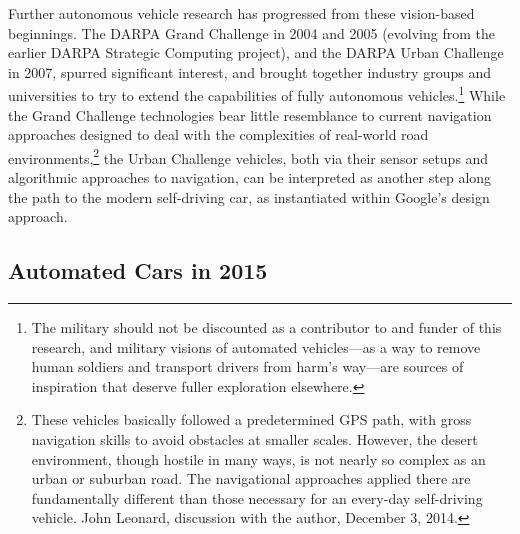 

Further autonomous vehicle research has progressed from
these vision-based beginnings. The
DARPA Grand Challenge in 2004 and 2005 (evolving from the earlier
  DARPA Strategic Computing project), and the DARPA Urban Challenge 
in 2007, spurred significant interest, and brought together industry
groups and universities to 
try to extend the capabilities of fully autonomous vehicles.\footnote{The
military should not be discounted as a contributor to and funder of
  this research, and military visions of automated vehicles---as a way
  to remove human soldiers and transport drivers from harm's way---are
  sources of inspiration that deserve fuller
  exploration elsewhere.} While the
Grand Challenge technologies bear little resemblance to current
navigation approaches designed to deal with the complexities of
real-world road environments,\footnote{These vehicles basically
  followed a predetermined GPS path, with gross navigation skills to
  avoid obstacles at smaller scales. However, the desert environment,
  though hostile in many ways, is not nearly so complex as an urban or
suburban road. The navigational approaches applied there are
fundamentally different than those necessary for an every-day
self-driving vehicle. John Leonard,
  discussion with the author, December 3, 2014.} the Urban Challenge
vehicles, both via their sensor setups and algorithmic approaches to
navigation, can be interpreted as another step along the path to the
modern self-driving car, as instantiated within Google's design approach. 

\subsection{Automated Cars in 2015}


